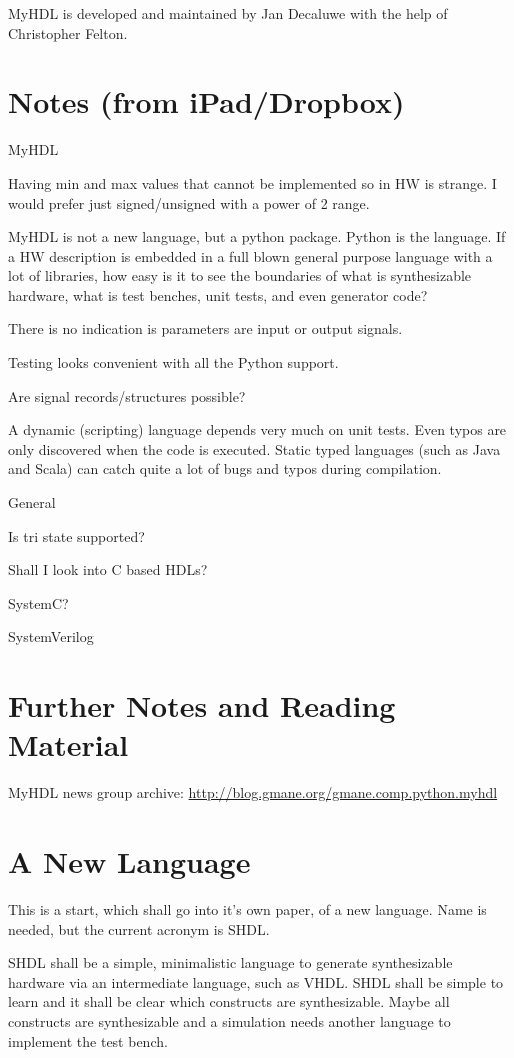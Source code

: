 \documentclass[10pt, conference, compsocconf]{IEEEtran}
\begin{document}
MyHDL is developed and maintained by Jan Decaluwe with the help of
Christopher Felton.  

\section{Notes (from iPad/Dropbox)}

MyHDL

Having min and max values that cannot be implemented so in HW is strange. I would prefer just signed/unsigned with a power of 2 range.

MyHDL is not a new language, but a python package. Python is the language. If a HW description is embedded in a full blown general purpose language with a lot of libraries, how easy is it to see the boundaries of what is synthesizable hardware, what is test benches, unit tests, and even generator code?

There is no indication is parameters are input or output signals.

Testing looks convenient with all the Python support.

Are signal records/structures possible?

A dynamic (scripting) language depends very much on unit tests. Even typos are only
discovered when the code is executed. Static typed languages (such as Java
and Scala) can catch quite a lot of bugs and typos during compilation.

General

Is tri state supported?

Shall I look into C based HDLs?

SystemC?

SystemVerilog

\section{Further Notes and Reading Material}

MyHDL news group archive: \url{http://blog.gmane.org/gmane.comp.python.myhdl}

\section{A New Language}

This is a start, which shall go into it's own paper, of a new language.
Name is needed, but the current acronym is SHDL.

SHDL shall be a simple, minimalistic language to generate synthesizable
hardware via an intermediate language, such as VHDL. SHDL shall
be simple to learn and it shall be clear which constructs are synthesizable.
Maybe all constructs are synthesizable and a simulation needs another
language to implement the test bench.
\end{document}
